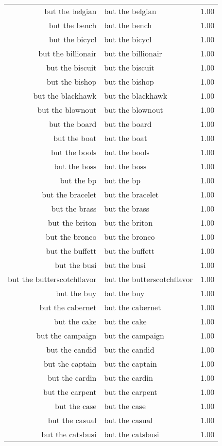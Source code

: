 \begin{table}[ht]
\begin{tabular}{rlr}
  but the belgian & but the belgian & 1.00 \\ 
  but the bench & but the bench & 1.00 \\ 
  but the bicycl & but the bicycl & 1.00 \\ 
  but the billionair & but the billionair & 1.00 \\ 
  but the biscuit & but the biscuit & 1.00 \\ 
  but the bishop & but the bishop & 1.00 \\ 
  but the blackhawk & but the blackhawk & 1.00 \\ 
  but the blownout & but the blownout & 1.00 \\ 
  but the board & but the board & 1.00 \\ 
  but the boat & but the boat & 1.00 \\ 
  but the bools & but the bools & 1.00 \\ 
  but the boss & but the boss & 1.00 \\ 
  but the bp & but the bp & 1.00 \\ 
  but the bracelet & but the bracelet & 1.00 \\ 
  but the brass & but the brass & 1.00 \\ 
  but the briton & but the briton & 1.00 \\ 
  but the bronco & but the bronco & 1.00 \\ 
  but the buffett & but the buffett & 1.00 \\ 
  but the busi & but the busi & 1.00 \\ 
  but the butterscotchflavor & but the butterscotchflavor & 1.00 \\ 
  but the buy & but the buy & 1.00 \\ 
  but the cabernet & but the cabernet & 1.00 \\ 
  but the cake & but the cake & 1.00 \\ 
  but the campaign & but the campaign & 1.00 \\ 
  but the candid & but the candid & 1.00 \\ 
  but the captain & but the captain & 1.00 \\ 
  but the cardin & but the cardin & 1.00 \\ 
  but the carpent & but the carpent & 1.00 \\ 
  but the case & but the case & 1.00 \\ 
  but the casual & but the casual & 1.00 \\ 
  but the catsbusi & but the catsbusi & 1.00 \\ 

\end{tabular}
\end{table}
